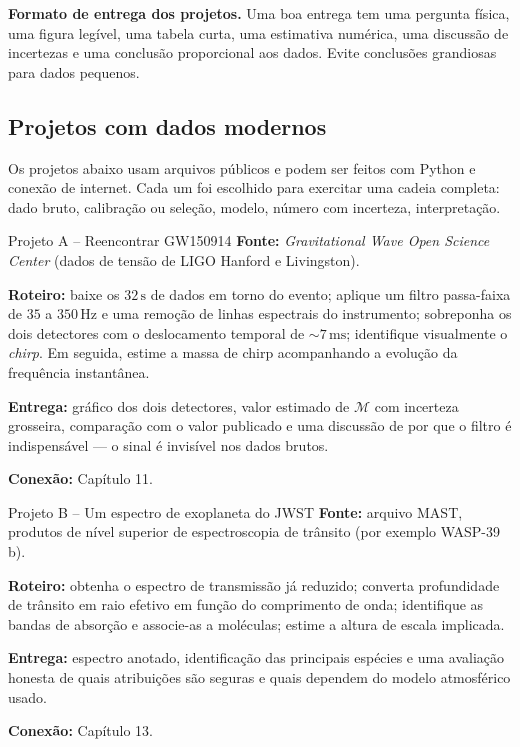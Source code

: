 \documentclass[11pt,a4paper]{article}
\begin{document}
\begin{noticebox}
\textbf{Formato de entrega dos projetos.} Uma boa entrega tem uma pergunta física, uma figura legível, uma tabela curta, uma estimativa numérica, uma discussão de incertezas e uma conclusão proporcional aos dados. Evite conclusões grandiosas para dados pequenos.
\end{noticebox}
\newpage
\subsection*{Projetos com dados modernos}

Os projetos abaixo usam arquivos públicos e podem ser feitos com Python e conexão de internet. Cada um foi escolhido para exercitar uma cadeia completa: dado bruto, calibração ou seleção, modelo, número com incerteza, interpretação.

\begin{lessonblock}{Projeto A -- Reencontrar GW150914}
\textbf{Fonte:} \textit{Gravitational Wave Open Science Center} (dados de tensão de LIGO Hanford e Livingston).

\textbf{Roteiro:} baixe os $32\,\mathrm{s}$ de dados em torno do evento; aplique um filtro passa-faixa de $35$ a $350\,\mathrm{Hz}$ e uma remoção de linhas espectrais do instrumento; sobreponha os dois detectores com o deslocamento temporal de $\sim7\,\mathrm{ms}$; identifique visualmente o \textit{chirp}. Em seguida, estime a massa de chirp acompanhando a evolução da frequência instantânea.

\textbf{Entrega:} gráfico dos dois detectores, valor estimado de $\mathcal{M}$ com incerteza grosseira, comparação com o valor publicado e uma discussão de por que o filtro é indispensável --- o sinal é invisível nos dados brutos.

\textbf{Conexão:} Capítulo 11.
\end{lessonblock}

\begin{lessonblock}{Projeto B -- Um espectro de exoplaneta do JWST}
\textbf{Fonte:} arquivo MAST, produtos de nível superior de espectroscopia de trânsito (por exemplo WASP-39\,b).

\textbf{Roteiro:} obtenha o espectro de transmissão já reduzido; converta profundidade de trânsito em raio efetivo em função do comprimento de onda; identifique as bandas de absorção e associe-as a moléculas; estime a altura de escala implicada.

\textbf{Entrega:} espectro anotado, identificação das principais espécies e uma avaliação honesta de quais atribuições são seguras e quais dependem do modelo atmosférico usado.

\textbf{Conexão:} Capítulo 13.
\end{lessonblock}
\end{document}
